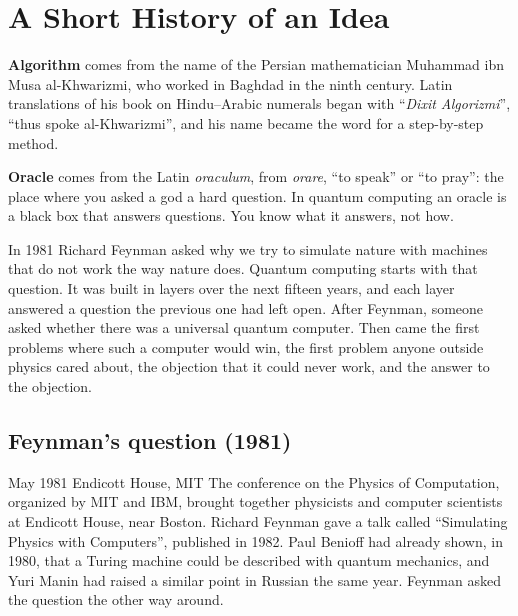 \chapter{A Short History of an Idea}\label{ch:history}

\begin{etymology}
\textbf{Algorithm} comes from the name of the Persian mathematician
Muhammad ibn Musa al-Khwarizmi, who worked in Baghdad in the ninth century.
Latin translations of his book on Hindu--Arabic numerals began with
``\emph{Dixit Algorizmi}'', ``thus spoke al-Khwarizmi'', and his name became the
word for a step-by-step method.

\textbf{Oracle} comes from the Latin \emph{oraculum}, from \emph{orare}, ``to
speak'' or ``to pray'': the place where you asked a god a hard question. In
quantum computing an oracle is a black box that answers questions. You know what
it answers, not how.
\end{etymology}

In 1981 Richard Feynman asked why we try to simulate nature with machines that do
not work the way nature does. Quantum computing starts with that question. It was
built in layers over the next fifteen years, and each layer answered a question
the previous one had left open. After Feynman, someone asked whether there was a
universal quantum computer. Then came the first problems where such a computer
would win, the first problem anyone outside physics cared about, the objection
that it could never work, and the answer to the objection.

\section{Feynman's question (1981)}

\begin{history}{May 1981 \textperiodcentered{} Endicott House, MIT}
The conference on the Physics of Computation, organized by MIT and IBM, brought
together physicists and computer scientists at Endicott House, near Boston.
Richard Feynman gave a talk called ``Simulating Physics with Computers'',
published in 1982. Paul Benioff had already shown, in 1980, that a Turing
machine could be described with quantum mechanics, and Yuri Manin had raised a
similar point in Russian the same year. Feynman asked the question the other
way around.
\end{history}

